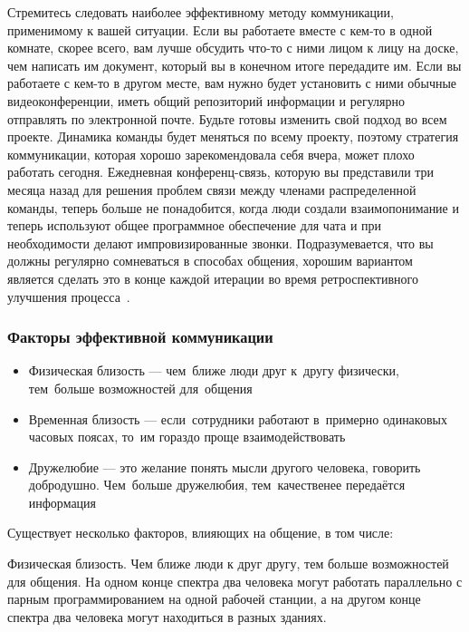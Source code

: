 \documentclass{../industrial-development}
\begin{document}
\lecturenotes

Стремитесь следовать наиболее эффективному методу коммуникации, применимому к вашей ситуации. Если вы работаете вместе с кем-то в одной комнате, скорее всего, вам лучше обсудить что-то с ними лицом к лицу на доске, чем написать им документ, который вы в конечном итоге передадите им. Если вы работаете с кем-то в другом месте, вам нужно будет установить с ними обычные видеоконференции, иметь общий репозиторий информации и регулярно отправлять по электронной почте.
Будьте готовы изменить свой подход во всем проекте. Динамика команды будет меняться по всему проекту, поэтому стратегия коммуникации, которая хорошо зарекомендовала себя вчера, может плохо работать сегодня. Ежедневная конференц-связь, которую вы представили три месяца назад для решения проблем связи между членами распределенной команды, теперь больше не понадобится, когда люди создали взаимопонимание и теперь используют общее программное обеспечение для чата и при необходимости делают импровизированные звонки. Подразумевается, что вы должны регулярно сомневаться в способах общения, хорошим вариантом является сделать это в конце каждой итерации во время ретроспективного улучшения процесса~\cite{AgileComm}.

\begin{frame} \frametitle{Факторы эффективной коммуникации}
  \begin{itemize}
  \item Физическая близость --- чем~ближе люди друг к~другу физически, тем~больше возможностей для~общения
  \item Временная близость --- если~сотрудники работают в~примерно одинаковых часовых поясах, то~им гораздо проще взаимодействовать
  \item Дружелюбие --- это желание понять мысли другого человека, говорить добродушно. Чем~больше дружелюбия, тем~качественее передаётся информация
  \end{itemize}
\end{frame}

\lecturenotes

Существует несколько факторов, влияющих на общение, в том числе:

Физическая близость. Чем ближе люди к друг другу, тем больше возможностей для общения. На одном конце спектра два человека могут работать параллельно с парным программированием на одной рабочей станции, а на другом конце спектра два человека могут находиться в разных зданиях.
\end{document}
